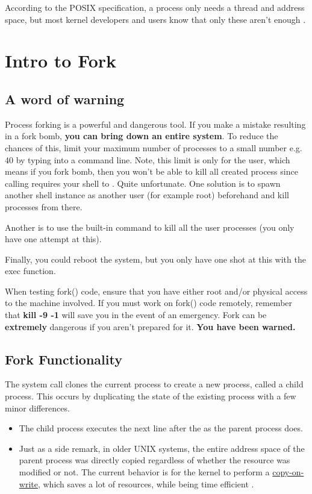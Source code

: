 According to the POSIX specification, a process only needs a thread and address space, but most kernel developers and users know that only these aren't enough \cite{process_def}.

\section{Intro to Fork}

\subsection{A word of warning}

Process forking is a powerful and dangerous tool.
If you make a mistake resulting in a fork bomb, \textbf{you can bring down an entire system}.
To reduce the chances of this, limit your maximum number of processes to a small number e.g. 40 by typing  into a command line.
Note, this limit is only for the user, which means if you fork bomb, then you won't be able to kill all created process since calling  requires your shell to .
Quite unfortunate.
One solution is to spawn another shell instance as another user (for example root) beforehand and kill processes from there.

Another is to use the built-in  command to kill all the user processes (you only have one attempt at this).

Finally, you could reboot the system, but you only have one shot at this with the exec function.

When testing fork() code, ensure that you have either root and/or physical access to the machine involved.
If you must work on fork() code remotely, remember that \textbf{kill -9 -1} will save you in the event of an emergency.
Fork can be \textbf{extremely} dangerous if you aren't prepared for it. \textbf{You have been warned.}

\subsection{Fork Functionality}

The  system call clones the current process to create a new process, called a child process.
This occurs by duplicating the state of the existing process with a few minor differences.
\begin{itemize}
    \item The child process  executes the next line after the  as the parent process does.
    \item Just as a side remark, in older UNIX systems, the entire address space of the parent process was directly copied regardless of whether the resource was modified or not. The current behavior is for the kernel to perform a \href{https://en.wikipedia.org/wiki/Copy-on-write}{copy-on-write}, which saves a lot of resources, while being time efficient \cite[Copy-on-write section]{Bovet:2005:ULK:1077084}.
\end{itemize}

